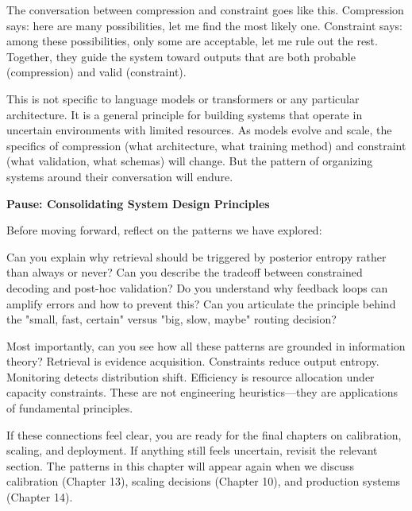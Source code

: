 The conversation between compression and constraint goes like this. Compression says: here are many possibilities, let me find the most likely one. Constraint says: among these possibilities, only some are acceptable, let me rule out the rest. Together, they guide the system toward outputs that are both probable (compression) and valid (constraint).

This is not specific to language models or transformers or any particular architecture. It is a general principle for building systems that operate in uncertain environments with limited resources. As models evolve and scale, the specifics of compression (what architecture, what training method) and constraint (what validation, what schemas) will change. But the pattern of organizing systems around their conversation will endure.

\vspace{2em}


\begin{pausebox}
\textbf{Pause: Consolidating System Design Principles}

\vspace{0.5em}

Before moving forward, reflect on the patterns we have explored:

\vspace{0.5em}

Can you explain why retrieval should be triggered by posterior entropy rather than always or never? Can you describe the tradeoff between constrained decoding and post-hoc validation? Do you understand why feedback loops can amplify errors and how to prevent this? Can you articulate the principle behind the "small, fast, certain" versus "big, slow, maybe" routing decision?

\vspace{0.5em}

Most importantly, can you see how all these patterns are grounded in information theory? Retrieval is evidence acquisition. Constraints reduce output entropy. Monitoring detects distribution shift. Efficiency is resource allocation under capacity constraints. These are not engineering heuristics—they are applications of fundamental principles.

\vspace{0.5em}

If these connections feel clear, you are ready for the final chapters on calibration, scaling, and deployment. If anything still feels uncertain, revisit the relevant section. The patterns in this chapter will appear again when we discuss calibration (Chapter 13), scaling decisions (Chapter 10), and production systems (Chapter 14).
\end{pausebox}

